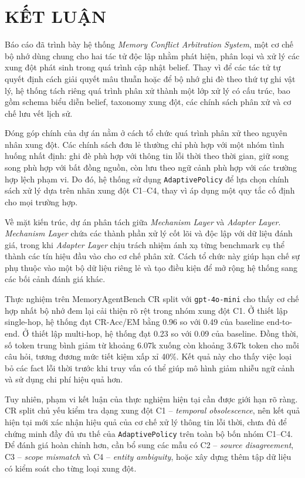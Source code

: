 \documentclass[12pt,a4paper]{article}
\newcommand{\code}[1]{\texttt{#1}}
\begin{document}
\section{KẾT LUẬN}

Báo cáo đã trình bày hệ thống \textit{Memory Conflict Arbitration System}, một cơ chế bộ nhớ dùng chung cho hai tác tử độc lập nhằm phát hiện, phân loại và xử lý các xung đột phát sinh trong quá trình cập nhật belief. Thay vì để các tác tử tự quyết định cách giải quyết mâu thuẫn hoặc để bộ nhớ ghi đè theo thứ tự ghi vật lý, hệ thống tách riêng quá trình phân xử thành một lớp xử lý có cấu trúc, bao gồm schema biểu diễn belief, taxonomy xung đột, các chính sách phân xử và cơ chế lưu vết lịch sử.

Đóng góp chính của dự án nằm ở cách tổ chức quá trình phân xử theo nguyên nhân xung đột. Các chính sách đơn lẻ thường chỉ phù hợp với một nhóm tình huống nhất định: ghi đè phù hợp với thông tin lỗi thời theo thời gian, giữ song song phù hợp với bất đồng nguồn, còn lưu theo ngữ cảnh phù hợp với các trường hợp lệch phạm vi. Do đó, hệ thống sử dụng \code{AdaptivePolicy} để lựa chọn chính sách xử lý dựa trên nhãn xung đột C1--C4, thay vì áp dụng một quy tắc cố định cho mọi trường hợp.

Về mặt kiến trúc, dự án phân tách giữa \textit{Mechanism Layer} và \textit{Adapter Layer}. \textit{Mechanism Layer} chứa các thành phần xử lý cốt lõi và độc lập với dữ liệu đánh giá, trong khi \textit{Adapter Layer} chịu trách nhiệm ánh xạ từng benchmark cụ thể thành các tín hiệu đầu vào cho cơ chế phân xử. Cách tổ chức này giúp hạn chế sự phụ thuộc vào một bộ dữ liệu riêng lẻ và tạo điều kiện để mở rộng hệ thống sang các bối cảnh đánh giá khác.

Thực nghiệm trên MemoryAgentBench CR split với \code{gpt-4o-mini} cho thấy cơ chế hợp nhất bộ nhớ đem lại cải thiện rõ rệt trong nhóm xung đột C1. Ở thiết lập single-hop, hệ thống đạt CR-Acc/EM bằng 0.96 so với 0.49 của baseline end-to-end. Ở thiết lập multi-hop, hệ thống đạt 0.23 so với 0.09 của baseline. Đồng thời, số token trung bình giảm từ khoảng 6.07k xuống còn khoảng 3.67k token cho mỗi câu hỏi, tương đương mức tiết kiệm xấp xỉ 40\%. Kết quả này cho thấy việc loại bỏ các fact lỗi thời trước khi truy vấn có thể giúp mô hình giảm nhiễu ngữ cảnh và sử dụng chi phí hiệu quả hơn.

Tuy nhiên, phạm vi kết luận của thực nghiệm hiện tại cần được giới hạn rõ ràng. CR split chủ yếu kiểm tra dạng xung đột C1 -- \textit{temporal obsolescence}, nên kết quả hiện tại mới xác nhận hiệu quả của cơ chế xử lý thông tin lỗi thời, chưa đủ để chứng minh đầy đủ ưu thế của \code{AdaptivePolicy} trên toàn bộ bốn nhóm C1--C4. Để đánh giá hoàn chỉnh hơn, cần bổ sung các mẫu có C2 -- \textit{source disagreement}, C3 -- \textit{scope mismatch} và C4 -- \textit{entity ambiguity}, hoặc xây dựng thêm tập dữ liệu có kiểm soát cho từng loại xung đột.
\end{document}
